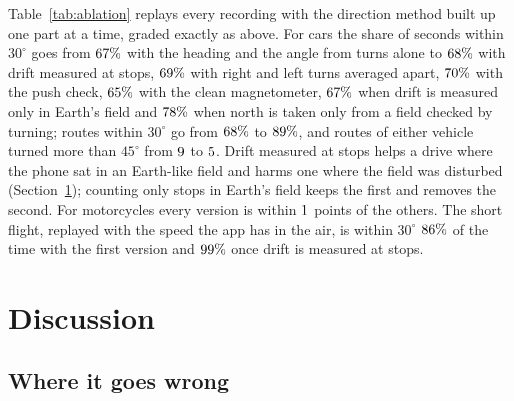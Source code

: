 \documentclass[11pt]{article}
\newcommand{\dg}{^\circ}
\begin{document}
Table~\ref{tab:ablation} replays every recording with the direction method built up one part at a time,
graded exactly as above. For cars the share of seconds within $30\dg$ goes from $67\%$ with the heading and
the angle from turns alone to $68\%$ with drift measured at stops, $69\%$ with right and left turns
averaged apart, $70\%$ with the push check, $65\%$ with the clean magnetometer, $67\%$ when
drift is measured only in Earth's field and $78\%$ when north is taken only from a field checked by turning; routes
within $30\dg$ go from $68\%$ to $89\%$, and routes of either
vehicle turned more than $45\dg$ from $9$ to $5$. Drift measured at stops helps a drive where the phone sat
in an Earth-like field and harms one where the field was disturbed (Section~\ref{sec:discussion}); counting
only stops in Earth's field keeps the first and removes the second. For motorcycles every version is within
$1$ points of the others. The short flight, replayed with the speed the app has in the air, is within
$30\dg$ $86\%$ of the time with the first version and $99\%$ once drift is measured at stops.

\begin{table}[t]
\centering\small
\caption{What each part of the direction method adds: the share of graded seconds and of whole routes
within $30\dg$, routes turned more than $45\dg$, and the flight's seconds within $30\dg$. Each row adds
one part to the row above. The magnetometer applies only where the magnetic field was recorded ($\nMagCars$
car drives and $\nMagMotos$ motorcycle rides so far).}
\label{tab:ablation}
\setlength{\tabcolsep}{4.5pt}

\end{table}

\section{Discussion}\label{sec:discussion}

\subsection{Where it goes wrong}\label{sec:wrong}
\end{document}
